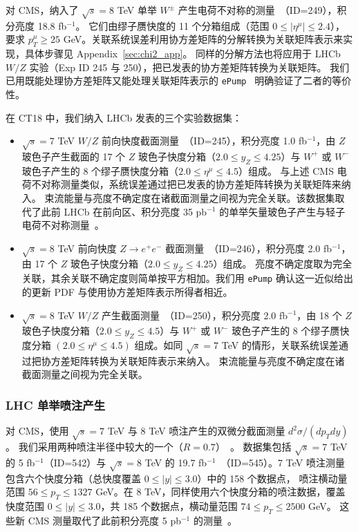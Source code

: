 对 CMS，纳入了 $\sqrt{s} = 8$ TeV 单举 ${W}^{\pm}$ 产生电荷不对称的测量~\cite{Khachatryan:2016pev}（ID=249），积分亮度 18.8 fb$^{-1}$。
它们由缪子赝快度的 11 个分箱组成（范围 $0\leq |\eta^\mu|\leq 2.4$），要求 $p^\mu_T \geq 25$ GeV。关联系统误差利用协方差矩阵的分解转换为关联矩阵表示来实现，具体步骤见 Appendix~\ref{sec:chi2_app}。
同样的分解方法也将应用于 LHCb $W/Z$ 实验（Exp ID 245 与 250），把已发表的协方差矩阵转换为关联矩阵。
我们已用既能处理协方差矩阵又能处理关联矩阵表示的 \texttt{ePump}~\cite{Hou:2019gfw} 明确验证了二者的等价性。

在 CT18 中，我们纳入 LHCb 发表的三个实验数据集：
\begin{itemize}
\item $\sqrt{s}=7$ TeV $W/Z$ 前向快度截面测量~\cite{Aaij:2015gna}（ID=245），积分亮度 1.0 fb$^{-1}$，由 $Z$ 玻色子产生截面的 17 个 $Z$ 玻色子快度分箱（$2.0 \leq y_Z \leq 4.25$）与 $W^+$ 或 $W^-$ 玻色子产生的 8 个缪子赝快度分箱（$2.0 \leq \eta^\mu \leq 4.5$）组成。
与上述 CMS 电荷不对称测量类似，系统误差通过把已发表的协方差矩阵转换为关联矩阵来纳入。
束流能量与亮度不确定度在诸截面测量之间视为完全关联。该数据集取代了此前 LHCb 在前向区、积分亮度 35 pb$^{-1}$ 的单举矢量玻色子产生与轻子电荷不对称测量~\cite{Aaij:2012vn}。

\item $\sqrt{s}=8$ TeV 前向快度 $Z\rightarrow e^+e^-$ 截面测量~\cite{Aaij:2015vua}（ID=246），积分亮度 2.0 fb$^{-1}$，由 17 个 $Z$ 玻色子快度分箱（$2.0 \leq y_Z \leq 4.25$）组成。
亮度不确定度取为完全关联，其余关联不确定度则简单按平方相加。我们用 \texttt{ePump} 确认这一近似给出的更新 PDF 与使用协方差矩阵表示所得者相近。


\item $\sqrt{s}=8$ TeV $W/Z$ 产生截面测量~\cite{Aaij:2015zlq}（ID=250），积分亮度 2.0 fb$^{-1}$，由 18 个 $Z$ 玻色子快度分箱（$2.0 \leq y_Z \leq 4.5$）与 $W^+$ 或 $W^-$ 玻色子产生的 8 个缪子赝快度分箱 $(2.0 \leq \eta^\mu \leq 4.5)$ 组成。如同 $\sqrt{s}=7$ TeV 的情形，关联系统误差通过把协方差矩阵转换为关联矩阵表示来纳入。
束流能量与亮度不确定度在诸截面测量之间视为完全关联。

\end{itemize}


\subsubsection{LHC 单举喷注产生
\label{sec:DataJets}
}
对 CMS，使用 $\sqrt{s}=7$ TeV 与 8 TeV 喷注产生的双微分截面测量 $d^2\sigma /(dp_T dy)$。
我们采用两种喷注半径中较大的一个（$R=0.7$）~\cite{Chatrchyan:2014gia}。
数据集包括 $\sqrt{s}=7$ TeV 的 5 fb$^{-1}$（ID=542）与 $\sqrt{s}=8$ TeV 的 19.7 fb$^{-1}$~\cite{Khachatryan:2016mlc}（ID=545）。7 TeV 喷注测量包含六个快度分箱（总快度覆盖 $0\leq |y|\leq 3.0$）中的 158 个数据点，
喷注横动量范围 $56\leq p_T\leq 1327$ GeV。在 8 TeV，同样使用六个快度分箱的喷注数据，覆盖快度范围 $0\leq |y|\leq 3.0$，共 185 个数据点，横动量范围 $74\leq p_T\leq 2500$ GeV。
这些新 CMS 测量取代了此前积分亮度 5 pb$^{-1}$ 的测量~\cite{Chatrchyan:2012bja}。

